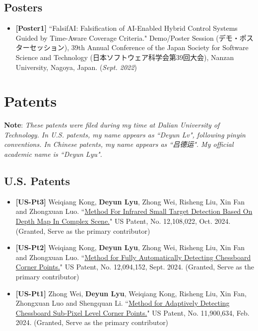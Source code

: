 \documentclass[11pt,a4paper]{moderncv}        %
\begin{document}
\subsection{Posters}

\begin{itemize}
    \item \textbf{[Poster1]} ``FalsifAI: Falsification of AI-Enabled Hybrid Control Systems Guided by Time-Aware Coverage Criteria." Demo/Poster Session (デモ・ポスターセッション), 39th Annual Conference of the Japan Society for Software Science and Technology (日本ソフトウェア科学会第39回大会), Nanzan University, Nagoya, Japan. (\textit{Sept. 2022})
\end{itemize}

\section{Patents}
\hypertarget{sec:patents}{}
\noindent \textbf{Note}: \textit{These patents were filed during my time at Dalian University of Technology. In U.S. patents, my name appears as ``Deyun Lv", following pinyin conventions. In Chinese patents, my name appears as ``吕德运". My official academic name is ``Deyun Lyu".}

\subsection{U.S. Patents}
\begin{itemize}
    \item \textbf{[US-Pt3]} Weiqiang Kong, \textbf{Deyun Lyu}, Zhong Wei, Risheng Liu, Xin Fan and Zhongxuan Luo. ``\href{https://patents.google.com/patent/US20220174256A1/en}{Method For Infrared Small Target Detection Based On Depth Map In Complex Scene.}" US Patent, No. 12,108,022, Oct. 2024. (Granted, Serve as the primary contributor)
    \item \textbf{[US-Pt2]} Weiqiang Kong, \textbf{Deyun Lyu}, Zhong Wei, Risheng Liu, Xin Fan and Zhongxuan Luo. ``\href{https://patents.google.com/patent/US20220148213A1/en}{Method for Fully Automatically Detecting Chessboard Corner Points.}" US Patent, No. 12,094,152, Sept. 2024. (Granted, Serve as the primary contributor)
    \item \textbf{[US-Pt1]} Zhong Wei, \textbf{Deyun Lyu}, Weiqiang Kong, Risheng Liu, Xin Fan, Zhongxuan Luo and Shengquan Li. ``\href{https://patents.google.com/patent/US11900634B2/en}{Method for Adaptively Detecting Chessboard Sub-Pixel Level Corner Points.}" US Patent, No. 11,900,634, Feb. 2024. (Granted, Serve as the primary contributor)
\end{itemize}
\end{document}
